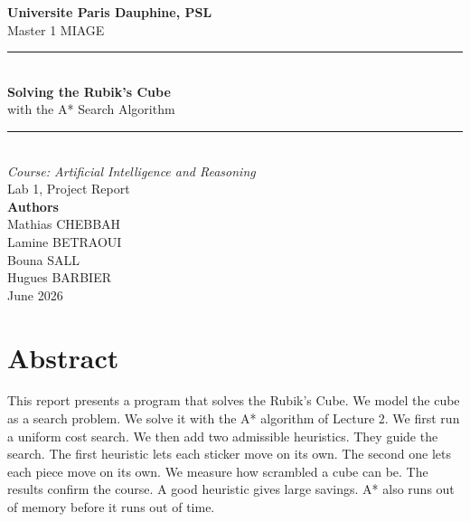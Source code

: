 \documentclass[11pt,a4paper]{article}
\begin{document}
\begin{titlepage}
\centering
\vspace*{2cm}

{\Large \textbf{Universite Paris Dauphine, PSL}}\\[0.3cm]
{\large Master 1 MIAGE}\\[2.5cm]

{\color{dauphineblue}\rule{\linewidth}{1.2pt}}\\[0.4cm]
{\huge \textbf{Solving the Rubik's Cube}}\\[0.5cm]
{\LARGE with the A* Search Algorithm}\\[0.4cm]
{\color{dauphineblue}\rule{\linewidth}{1.2pt}}\\[1.5cm]

{\large \textit{Course: Artificial Intelligence and Reasoning}}\\[0.3cm]
{\large Lab 1, Project Report}\\[2.5cm]

{\large \textbf{Authors}}\\[0.3cm]
{\large Mathias CHEBBAH}\\[0.15cm]
{\large Lamine BETRAOUI}\\[0.15cm]
{\large Bouna SALL}\\[0.15cm]
{\large Hugues BARBIER}\\[2cm]

\vfill
{\large June 2026}

\end{titlepage}

\section*{Abstract}

This report presents a program that solves the Rubik's Cube. We model the cube as
a search problem. We solve it with the A* algorithm of Lecture 2. We first run a
uniform cost search. We then add two admissible heuristics. They guide the search.
The first heuristic lets each sticker move on its own. The second one lets each
piece move on its own. We measure how scrambled a cube can be. The results confirm
the course. A good heuristic gives large savings. A* also runs out of memory
before it runs out of time.
\end{document}
